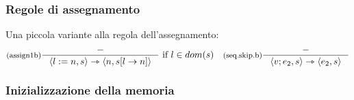 \documentclass[a4paper, 11pt]{article}
\begin{document}
\subsubsection{Regole di assegnamento}
Una piccola variante alla regola dell'assegnamento: \begin{align*}
	&\inference[(assign1b)]{-}{\langle l:=n,s \rangle \rightarrowtriangle \langle n, s\lbrack l \to n\rbrack \rangle}\ \text{if } l \in dom(s)
	&\inference[(seq.skip.b)]{-}{\langle v;e_2, s \rangle \rightarrowtriangle \langle e_2, s \rangle}
\end{align*}

\subsubsection{Inizializzazione della memoria}


	
\end{document}
